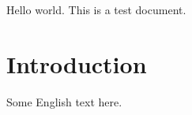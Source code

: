 \documentclass{article}
\begin{document}
Hello world. This is a test document.
\section{Introduction}
Some English text here.
\end{document}
